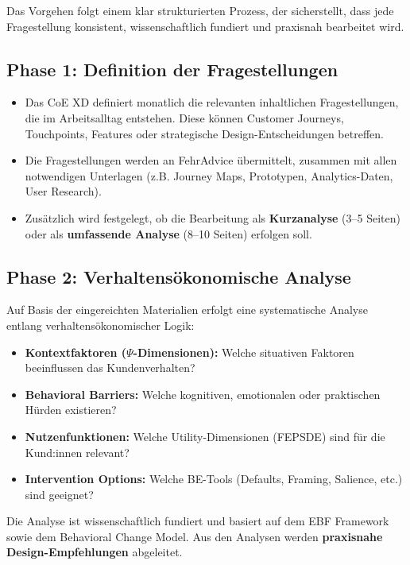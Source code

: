 \documentclass{fehradvice-report}
\begin{document}
Das Vorgehen folgt einem klar strukturierten Prozess, der sicherstellt, dass jede Fragestellung konsistent, wissenschaftlich fundiert und praxisnah bearbeitet wird.

\subsection{Phase 1: Definition der Fragestellungen}

\begin{itemize}
    \item Das CoE XD definiert monatlich die relevanten inhaltlichen Fragestellungen, die im Arbeitsalltag entstehen. Diese können Customer Journeys, Touchpoints, Features oder strategische Design-Entscheidungen betreffen.
    \item Die Fragestellungen werden an FehrAdvice übermittelt, zusammen mit allen notwendigen Unterlagen (z.B. Journey Maps, Prototypen, Analytics-Daten, User Research).
    \item Zusätzlich wird festgelegt, ob die Bearbeitung als \textbf{Kurzanalyse} (3--5 Seiten) oder als \textbf{umfassende Analyse} (8--10 Seiten) erfolgen soll.
\end{itemize}

\subsection{Phase 2: Verhaltensökonomische Analyse}

Auf Basis der eingereichten Materialien erfolgt eine systematische Analyse entlang verhaltensökonomischer Logik:

\begin{itemize}
    \item \textbf{Kontextfaktoren ($\Psi$-Dimensionen):} Welche situativen Faktoren beeinflussen das Kundenverhalten?
    \item \textbf{Behavioral Barriers:} Welche kognitiven, emotionalen oder praktischen Hürden existieren?
    \item \textbf{Nutzenfunktionen:} Welche Utility-Dimensionen (FEPSDE) sind für die Kund:innen relevant?
    \item \textbf{Intervention Options:} Welche BE-Tools (Defaults, Framing, Salience, etc.) sind geeignet?
\end{itemize}

Die Analyse ist wissenschaftlich fundiert und basiert auf dem EBF Framework sowie dem Behavioral Change Model. Aus den Analysen werden \textbf{praxisnahe Design-Empfehlungen} abgeleitet.
\end{document}
